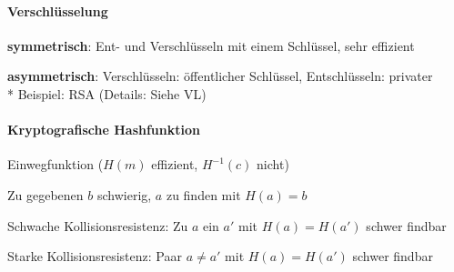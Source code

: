 \paragraph{Verschlüsselung}
\begin{items}
	\item \textbf{symmetrisch}: Ent- und Verschlüsseln mit einem Schlüssel, sehr effizient
	\item \textbf{asymmetrisch}: Verschlüsseln: öffentlicher Schlüssel, Entschlüsseln: privater\\*
		Beispiel: RSA (Details: Siehe VL) %
\end{items}

\paragraph{Kryptografische Hashfunktion}
\begin{items}
	\item Einwegfunktion ($H(m)$ effizient, $H^{-1}(c)$ nicht)
	\item Zu gegebenen $b$ schwierig, $a$ zu finden mit $H(a) = b$
	\item Schwache Kollisionsresistenz: Zu $a$ ein $a'$ mit $H(a) = H(a')$ schwer findbar
	\item Starke Kollisionsresistenz: Paar $a \neq a'$ mit $H(a) = H(a')$ schwer findbar
\end{items}

